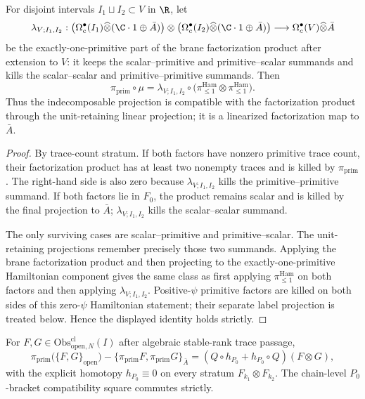\begin{thm}\label{thm:chain-level-primitive-projection-factorization}
  For disjoint intervals \(I_1\sqcup I_2\subset V\) in \(\R\), let
  \[
    \lambda_{V;I_1,I_2}:
    \bigl(\Omega^\bullet_c(I_1)\widehat\otimes(\C\cdot1\oplus\bar A)\bigr)
    \otimes
    \bigl(\Omega^\bullet_c(I_2)\widehat\otimes(\C\cdot1\oplus\bar A)\bigr)
    \longrightarrow
    \Omega^\bullet_c(V)\widehat\otimes\bar A
  \]
  be the exactly-one-primitive part of the brane factorization product
  after extension to \(V\): it keeps the scalar--primitive and
  primitive--scalar summands and kills the scalar--scalar and
  primitive--primitive summands.  Then
  \[
    \pi_{\mathrm{prim}}\circ\mu
      =
    \lambda_{V;I_1,I_2}\circ
      \bigl(\pi_{\leq1}^{\mathrm{Ham}}\otimes
            \pi_{\leq1}^{\mathrm{Ham}}\bigr).
  \]
  Thus the indecomposable projection is compatible with the factorization
  product through the unit-retaining linear projection; it is a
  linearized factorization map to \(\bar A\).
\end{thm}

\begin{proof}
  By trace-count stratum.  If both factors have nonzero primitive
  trace count, their factorization product has at least two nonempty
  traces and is killed by \(\pi_{\mathrm{prim}}\).  The right-hand side is
  also zero because \(\lambda_{V;I_1,I_2}\) kills the
  primitive--primitive summand.  If both factors lie in \(F_0\), the
  product remains scalar and is killed by the final projection to
  \(\bar A\); \(\lambda_{V;I_1,I_2}\) kills the scalar--scalar summand.

  The only surviving cases are scalar--primitive and primitive--scalar.
  The unit-retaining projections remember precisely those two summands.
  Applying the brane factorization product and then projecting to the
  exactly-one-primitive Hamiltonian component gives the same class as
  first applying \(\pi_{\leq1}^{\mathrm{Ham}}\) on both factors and then
  applying \(\lambda_{V;I_1,I_2}\).  Positive-\(\psi\) primitive factors
  are killed on both sides of this zero-\(\psi\) Hamiltonian statement;
  their separate label projection is treated below.  Hence the displayed
  identity holds strictly.
\end{proof}

\begin{thm}\label{thm:chain-level-primitive-projection-P0}
  For $F,G\in\mathrm{Obs}^{\mathrm{cl}}_{\mathrm{open},N}(I)$ after
  algebraic stable-rank trace passage,
  $$\pi_{\mathrm{prim}}\bigl(\{F,G\}_{\mathrm{open}}\bigr)
    -\bigl\{\pi_{\mathrm{prim}}F,\pi_{\mathrm{prim}}G\bigr\}_{\bar A}
    =(Q\circ h_{P_0}+h_{P_0}\circ Q)(F\otimes G),$$
  with the explicit homotopy $h_{P_0}\equiv 0$ on every stratum
  $F_{k_1}\otimes F_{k_2}$. The chain-level $P_0$-bracket compatibility
  square commutes strictly.
\end{thm}

